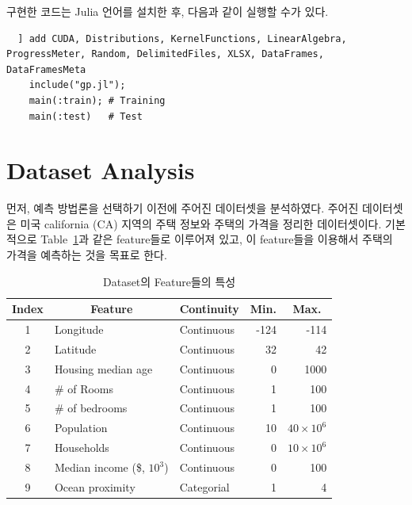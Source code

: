 \documentclass[ba]{imsart}
\begin{document}
구현한 코드는 Julia 언어를 설치한 후, 다음과 같이 실행할 수가 있다.
\begin{verbatim}
  ] add CUDA, Distributions, KernelFunctions, LinearAlgebra, ProgressMeter, Random, DelimitedFiles, XLSX, DataFrames, DataFramesMeta
    include("gp.jl");
    main(:train); # Training 
    main(:test)   # Test
\end{verbatim}

\section{Dataset Analysis}\label{section:anal}
먼저, 예측 방법론을 선택하기 이전에 주어진 데이터셋을 분석하였다. 
주어진 데이터셋은 미국 california (CA) 지역의 주택 정보와 주택의 가격을 정리한 데이터셋이다.
기본적으로 Table~\ref{table:features}과 같은 feature들로 이루어져 있고, 이 feature들을 이용해서 주택의 가격을 예측하는 것을 목표로 한다.
%
\begin{table}
  \centering
  \begin{threeparttable}
    \caption{Dataset의 Feature들의 특성}\label{table:features}
    \begin{tabular}{cllrr} \toprule
      \textbf{Index}
      & \multicolumn{1}{c}{\textbf{Feature}}
      & \multicolumn{1}{c}{\textbf{Continuity}}
      & \multicolumn{1}{c}{\textbf{Min.}}
      & \multicolumn{1}{c}{\textbf{Max.}}
      \\ \midrule
      1 & Longitude           & Continuous & -124 & -114 \\
      2 & Latitude            & Continuous & 32  & 42 \\
      3 & Housing median age  & Continuous & 0   & 1000 \\
      4 & \# of Rooms         & Continuous & 1   & 100 \\
      5 & \# of bedrooms      & Continuous & 1   & 100 \\
      6 & Population          & Continuous & 10  & \(40 \times 10^6\) \\
      7 & Households          & Continuous & 0   & \(10 \times 10^6\) \\
      8 & Median income (\$, \(10^3\)) & Continuous & 0   & 100 \\
      9 & Ocean proximity     & Categorial & 1 & 4 \\\bottomrule
    \end{tabular}
  \end{threeparttable}
\end{table}
\end{document}
